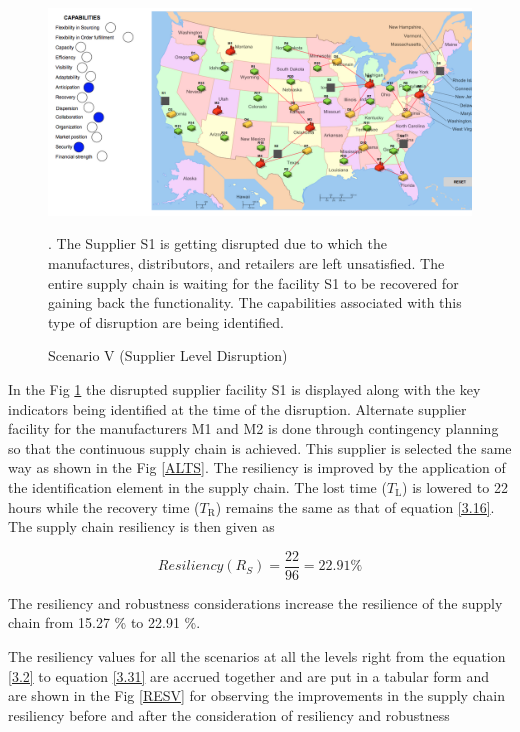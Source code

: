 \begin{figure}[H]
  \centering
  \includegraphics[width=6.5in]{figures/pdf/S5SLD.png}\\
  \caption{Scenario V (Supplier Level Disruption)}.
  {The Supplier S1 is getting disrupted due to which the manufactures, distributors, and retailers are left unsatisfied. The entire supply chain is waiting for the facility S1 to be recovered for gaining back the functionality. The capabilities associated with this type of disruption are being identified.}\label{S5SL}
\end{figure}  

In the Fig \ref{S5SL} the disrupted supplier facility S1 is displayed along with the key indicators being identified at the time of the disruption. Alternate supplier facility for the manufacturers M1 and M2 is done through contingency planning so that the continuous supply chain is achieved. This supplier is selected the same way as shown in the Fig \ref{ALTS}. The resiliency is improved by the application of the identification element in the supply chain. The lost time ($T_{\text{L}}$) is lowered to 22 hours while the recovery time ($T_{\text{R}}$) remains the same as that of equation \ref{3.16}. The supply chain resiliency is then given as

\begin{equation}
    Resiliency(R_S) = \frac{22}{96} = 22.91 \% \label{3.31}
\end{equation}

The resiliency and robustness considerations increase the resilience of the supply chain from 15.27 \% to 22.91 \%.

The resiliency values for all the scenarios at all the levels right from the equation \ref{3.2} to equation \ref{3.31} are accrued together and are put in a tabular form and are shown in the Fig \ref{RESV} for observing the improvements in the supply chain resiliency before and after the consideration of resiliency and robustness

